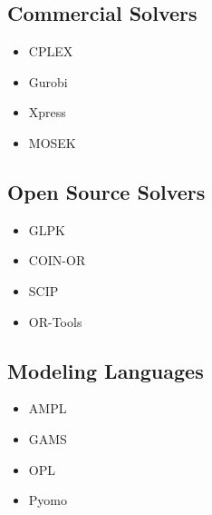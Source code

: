 \documentclass[11pt]{article}
\theoremstyle{definition}
\begin{document}
\subsection{Commercial Solvers}
\begin{itemize}
    \item CPLEX
    \item Gurobi
    \item Xpress
    \item MOSEK
\end{itemize}

\subsection{Open Source Solvers}
\begin{itemize}
    \item GLPK
    \item COIN-OR
    \item SCIP
    \item OR-Tools
\end{itemize}

\subsection{Modeling Languages}
\begin{itemize}
    \item AMPL
    \item GAMS
    \item OPL
    \item Pyomo
\end{itemize}
\end{document}
